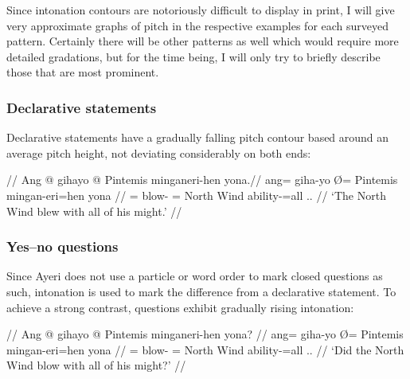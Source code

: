 Since intonation contours are notoriously difficult to display in print, I will
give very approximate graphs of pitch in the respective examples for each
surveyed pattern. Certainly there will be other patterns as well which would
require more detailed gradations, but for the time being, I will only try to
briefly describe those that are most prominent.

\subsubsection{Declarative statements}

Declarative statements have a gradually falling pitch contour based 
around an average pitch height, not deviating considerably on both ends:

\ex[belowexskip=0em]\begingl
	\glpreamble{} //
	\gla Ang @ gihayo {} @ Pintemis minganeri-hen yona.//
	\glb ang= giha-yo Ø= Pintemis mingan-eri=hen yona //
	\glc \AgtT{}= blow-\TsgN{} \Top{}= {North Wind} ability-\Ins{}=all
		\TsgN{}.\Gen{}. //
	\glft `The North Wind blew with all of his might.' //
\endgl\xe

\subsubsection{Yes–no questions}

Since Ayeri does not use a particle or word order to mark closed questions as 
such, intonation is used to mark the difference from a declarative statement. 
To achieve a strong contrast, questions exhibit gradually rising intonation:

\ex[belowexskip=0em]\begingl
	\glpreamble{} //
	\gla Ang @ gihayo {} @ Pintemis minganeri-hen yona? //
	\glb ang= giha-yo Ø= Pintemis mingan-eri=hen yona //
	\glc \AgtT{}= blow-\TsgN{} \Top{}= {North Wind} ability-\Ins{}=all
		\TsgN{}.\Gen{}. //
	\glft `Did the North Wind blow with all of his might?' //
\endgl\xe

